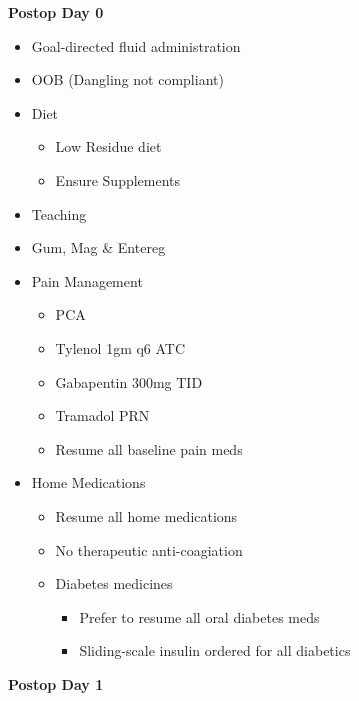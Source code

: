 \documentclass[
]{book}
\providecommand{\tightlist}{%
  \setlength{\itemsep}{0pt}\setlength{\parskip}{0pt}}
\begin{document}
\textbf{Postop Day 0}

\begin{itemize}
\tightlist
\item
  Goal-directed fluid administration
\item
  OOB (Dangling not compliant)
\item
  Diet

  \begin{itemize}
  \tightlist
  \item
    Low Residue diet
  \item
    Ensure Supplements
  \end{itemize}
\item
  Teaching
\item
  Gum, Mag \& Entereg
\item
  Pain Management

  \begin{itemize}
  \tightlist
  \item
    PCA
  \item
    Tylenol 1gm q6 ATC
  \item
    Gabapentin 300mg TID
  \item
    Tramadol PRN
  \item
    Resume all baseline pain meds
  \end{itemize}
\item
  Home Medications

  \begin{itemize}
  \tightlist
  \item
    Resume all home medications
  \item
    No therapeutic anti-coagiation
  \item
    Diabetes medicines

    \begin{itemize}
    \tightlist
    \item
      Prefer to resume all oral diabetes meds
    \item
      Sliding-scale insulin ordered for all diabetics
    \end{itemize}
  \end{itemize}
\end{itemize}

\textbf{Postop Day 1}
\end{document}
